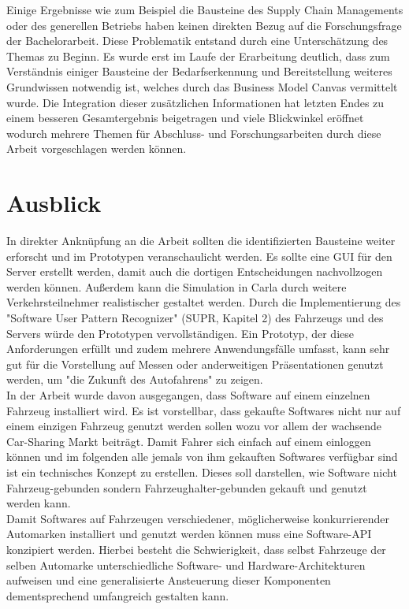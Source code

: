 Einige Ergebnisse wie zum Beispiel die Bausteine des Supply Chain Managements oder des generellen Betriebs haben keinen direkten Bezug auf die Forschungsfrage der Bachelorarbeit. Diese Problematik entstand durch eine Unterschätzung des Themas zu Beginn. Es wurde erst im Laufe der Erarbeitung deutlich, dass zum Verständnis einiger Bausteine der Bedarfserkennung und Bereitstellung weiteres Grundwissen notwendig ist, welches durch das Business Model Canvas vermittelt wurde. Die Integration dieser zusätzlichen Informationen hat letzten Endes zu einem besseren Gesamtergebnis beigetragen und viele Blickwinkel eröffnet wodurch mehrere Themen für Abschluss- und Forschungsarbeiten durch diese Arbeit vorgeschlagen werden können.
\section{Ausblick}
In direkter Anknüpfung an die Arbeit sollten die identifizierten Bausteine weiter erforscht und im Prototypen veranschaulicht werden. Es sollte eine GUI für den Server erstellt werden, damit auch die dortigen Entscheidungen nachvollzogen werden können. Außerdem kann die Simulation in Carla durch weitere Verkehrsteilnehmer realistischer gestaltet werden. Durch die Implementierung des "Software User Pattern Recognizer" (SUPR, Kapitel 2) des Fahrzeugs und des Servers würde den Prototypen vervollständigen. Ein Prototyp, der diese Anforderungen erfüllt und zudem mehrere Anwendungsfälle umfasst, kann sehr gut für die Vorstellung auf Messen oder anderweitigen Präsentationen genutzt werden, um "die Zukunft des Autofahrens" zu zeigen.\\

In der Arbeit wurde davon ausgegangen, dass Software auf einem einzelnen Fahrzeug installiert wird. Es ist vorstellbar, dass gekaufte Softwares nicht nur auf einem einzigen Fahrzeug genutzt werden sollen wozu vor allem der wachsende Car-Sharing Markt beiträgt. Damit Fahrer sich einfach auf einem einloggen können und im folgenden alle jemals von ihm gekauften Softwares verfügbar sind ist ein technisches Konzept zu erstellen. Dieses soll darstellen, wie Software nicht Fahrzeug-gebunden sondern Fahrzeughalter-gebunden gekauft und genutzt werden kann.\\
Damit Softwares auf Fahrzeugen verschiedener, möglicherweise konkurrierender Automarken installiert und genutzt werden können muss eine Software-API konzipiert werden. Hierbei besteht die Schwierigkeit, dass selbst Fahrzeuge der selben Automarke unterschiedliche Software- und Hardware-Architekturen aufweisen und eine generalisierte Ansteuerung dieser Komponenten dementsprechend umfangreich gestalten kann. 